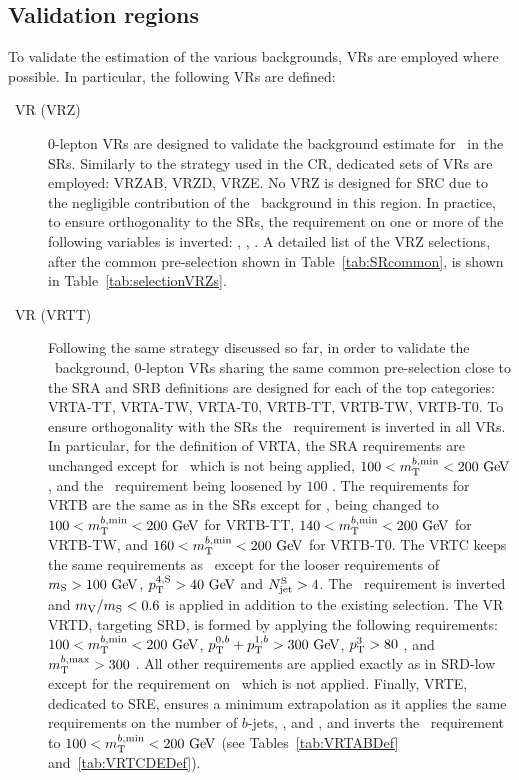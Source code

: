 

		\subsection{Validation regions}

			To validate the estimation of the various backgrounds, \acp{VR} are employed where possible. In particular, the following \acp{VR} are defined:

			\begin{description}

				\item [\Zjets\ VR (VRZ)] $0$-lepton \acp{VR} are designed to validate the background estimate for \Zjets\ in the \acp{SR}. Similarly to the strategy used in the \ac{CR}, dedicated sets of \acp{VR} are employed: VRZAB, VRZD, VRZE. No VRZ is designed for SRC due to the negligible contribution of the \Zboson\ background in this region. In practice, to ensure orthogonality to the \acp{SR}, the requirement on one or more of the following variables is inverted: \drbjetbjet, \mantikttwelvezero, \mantikteightzero. A detailed list of the VRZ selections, after the common pre-selection shown in Table~\ref{tab:SRcommon}, is shown in Table~\ref{tab:selectionVRZs}.

				\item [\ttbar\ VR (VRTT)] Following the same strategy discussed so far, in order to validate the \ttbar\ background, $0$-lepton \acp{VR} sharing the same common pre-selection close to the SRA and SRB definitions are designed for each of the top categories: VRTA-TT, VRTA-TW, VRTA-T0, VRTB-TT, VRTB-TW, VRTB-T0. To ensure orthogonality with the \acp{SR} the \mtbmin\ requirement is inverted in all \acp{VR}. In particular, for the definition of VRTA, the SRA requirements are unchanged except for \mttwo\, which is not being applied, $100<\mtbmin<200\gev$, and the \met\ requirement being loosened by $100$ \GeV. The requirements for VRTB are the same as in the \acp{SR} except for \mtbmin, being changed to $100<\mtbmin<200\gev$ for VRTB-TT, $140<\mtbmin<200\gev$ for VRTB-TW, and $160<\mtbmin<200\gev$ for VRTB-T0. The VRTC keeps the same requirements as \SRC\ except for the looser requirements of $\mS> 100\gev$, $\pTSFour>40\gev$ and $N_{\mathrm{jet}}^{\mathrm{S}} > 4$. The \dPhiISRMET\ requirement is inverted and $m_{\mathrm{V}}/m_{\mathrm{S}}<0.6$ is applied in addition to the existing selection. The \ac{VR} VRTD, targeting SRD, is formed by applying the following requirements: $100<\mtbmin<200\gev$, $\ptbzero+\ptbone>300\gev$, $p_{\mathrm{T}}^{3}>80$ \GeV, and $m_{\mathrm{T}}^{b,\mathrm{max}}>300$ \GeV. All other requirements are applied exactly as in SRD-low except for the requirement on \ptfour\ which is not applied. Finally, VRTE, dedicated to SRE, ensures a minimum extrapolation as it applies the same requirements on the number of $b$-jets, \mantikteightzero, and \mantikteightone, and inverts the \mtbmin\ requirement to $100<\mtbmin<200\gev$ (see Tables~\ref{tab:VRTABDef} and~\ref{tab:VRTCDEDef}).


\end{description}
